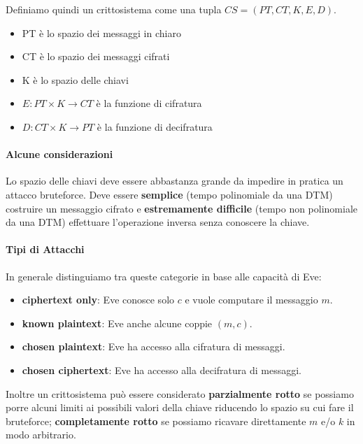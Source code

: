 Definiamo quindi un crittosistema come una tupla $CS = (PT, CT, K, E, D)$.

\begin{itemize}
  \item PT \`e lo spazio dei messaggi in chiaro
  \item CT \`e lo spazio dei messaggi cifrati
  \item K \`e lo spazio delle chiavi
  \item $E : PT \times K \rightarrow CT$ \`e la funzione di cifratura
  \item $D : CT \times K \rightarrow PT$ \`e la funzione di decifratura
\end{itemize}

\paragraph{Alcune considerazioni}

Lo spazio delle chiavi deve essere abbastanza grande da impedire in pratica un attacco bruteforce. Deve essere \textbf{semplice} (tempo polinomiale da una DTM) costruire un messaggio cifrato e \textbf{estremamente difficile} (tempo non polinomiale da una DTM) effettuare l'operazione inversa senza conoscere la chiave.

\paragraph{Tipi di Attacchi}

In generale distinguiamo tra queste categorie in base alle capacit\`a di Eve:

\begin{itemize}
  \item \textbf{ciphertext only}: Eve conosce solo $c$ e vuole computare il messaggio $m$.
  \item \textbf{known plaintext}: Eve anche alcune coppie $(m, c)$.
  \item \textbf{chosen plaintext}: Eve ha accesso alla cifratura di messaggi.
  \item \textbf{chosen ciphertext}: Eve ha accesso alla decifratura di messaggi.
\end{itemize}

Inoltre un crittosistema pu\`o essere considerato \textbf{parzialmente rotto} se possiamo porre alcuni limiti ai possibili valori della chiave riducendo lo spazio su cui fare il bruteforce; \textbf{completamente rotto} se possiamo ricavare direttamente $m$ e/o $k$ in modo arbitrario.

